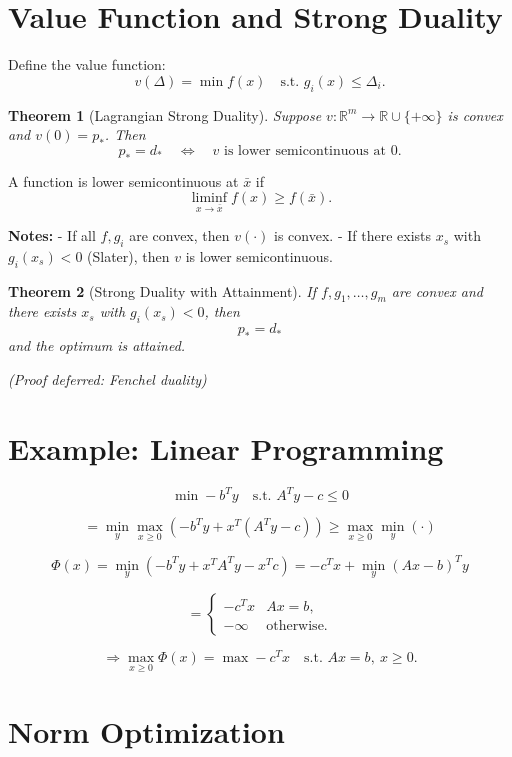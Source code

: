 \documentclass[12pt,oneside]{book}
\numberwithin{equation}{section}
\theoremstyle{definition}
\theoremstyle{plain}
\newtheorem{theorem}{Theorem}[section]
\theoremstyle{remark}
\begin{document}
\section{Value Function and Strong Duality}

Define the value function:
\[
v(\Delta) = \min f(x)
\quad \text{s.t. } g_i(x) \le \Delta_i.
\]

\begin{theorem}[Lagrangian Strong Duality]
Suppose $v:\mathbb{R}^m \to \mathbb{R}\cup\{+\infty\}$ is convex and $v(0)=p_*$. Then
\[
p_* = d_*
\quad \Longleftrightarrow \quad
v \text{ is lower semicontinuous at } 0.
\]
\end{theorem}

A function is lower semicontinuous at $\bar{x}$ if
\[
\liminf_{x\to\bar{x}} f(x) \ge f(\bar{x}).
\]

\textbf{Notes:}
- If all $f,g_i$ are convex, then $v(\cdot)$ is convex.  
- If there exists $x_s$ with $g_i(x_s) < 0$ (Slater), then $v$ is lower semicontinuous.

\begin{theorem}[Strong Duality with Attainment]
If $f,g_1,\dots,g_m$ are convex and there exists $x_s$ with $g_i(x_s)<0$, then
\[
p_* = d_*
\]
and the optimum is attained.
\end{theorem}

\textit{(Proof deferred: Fenchel duality)}

\section*{Example: Linear Programming}

\[
\min -b^T y \quad \text{s.t. } A^T y - c \le 0
\]

\[
= \min_y \max_{x \ge 0} \left(-b^T y + x^T(A^T y - c)\right)
\ge \max_{x \ge 0} \min_y (\cdot)
\]

\[
\Phi(x) = \min_y \left(-b^T y + x^T A^T y - x^T c \right)
= -c^T x + \min_y (Ax - b)^T y
\]

\[
=
\begin{cases}
-c^T x & Ax = b,\\
-\infty & \text{otherwise}.
\end{cases}
\]

\[
\Rightarrow
\max_{x \ge 0} \Phi(x)
=
\max -c^T x \quad \text{s.t. } Ax = b,\ x \ge 0.
\]

\section{Norm Optimization}
\end{document}
